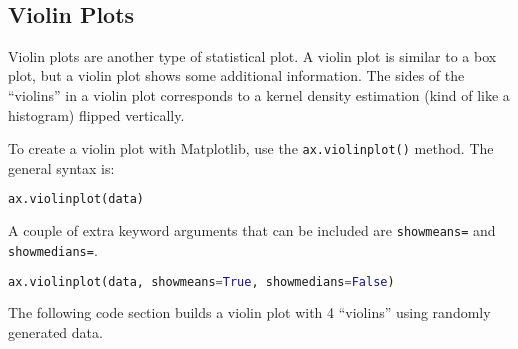 \documentclass{book}
\newcommand{\passthrough}[1]{#1}
\begin{document}
    \begin{center}
    \end{center}
    { \hspace*{\fill} \\}
    

    
        \hypertarget{violin-plots}{%
\subsection{Violin Plots}\label{violin-plots}}
    




    
        Violin plots are another type of statistical plot. A violin plot is
similar to a box plot, but a violin plot shows some additional
information. The sides of the ``violins'' in a violin plot corresponds
to a kernel density estimation (kind of like a histogram) flipped
vertically.

To create a violin plot with Matplotlib, use the
\passthrough{\lstinline!ax.violinplot()!} method. The general syntax is:

\begin{lstlisting}[language=Python]
ax.violinplot(data)
\end{lstlisting}

A couple of extra keyword arguments that can be included are
\passthrough{\lstinline!showmeans=!} and
\passthrough{\lstinline!showmedians=!}.

\begin{lstlisting}[language=Python]
ax.violinplot(data, showmeans=True, showmedians=False)
\end{lstlisting}

The following code section builds a violin plot with 4 ``violins'' using
randomly generated data.
    
\end{document}
